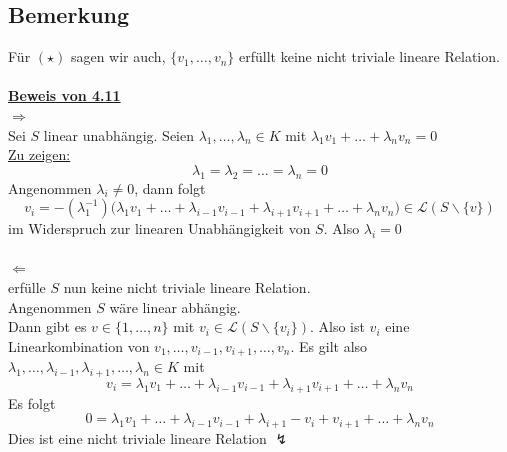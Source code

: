 \subsection{Bemerkung} %
\label{sub:bemerkung}
Für $(\star)$ sagen wir auch, $\{v_1, \ldots , v_n\}$ erfüllt keine nicht triviale lineare Relation. \\
\vspace{\baselineskip} \\
\underline{\textbf{Beweis von 4.11}}
\vspace{\baselineskip} \\
\grqq$\Longrightarrow$\grqq \\
Sei $S$ linear unabhängig. Seien $\lambda_1, \ldots , \lambda_n \in K$ mit $\lambda_1 v_1 + \ldots + \lambda_n v_n = 0$ \\
\underline{Zu zeigen:}
\[
	\lambda_1 = \lambda_2 = \ldots = \lambda_n = 0
\]
Angenommen $\lambda_i \not= 0$, dann folgt
\[
	v_i = - (\lambda_1^{-1}) \big(\lambda_1 v_1+ \ldots + \lambda_{i-1} v_{i-1} + \lambda_{i+1} v_{i+1} + \ldots + \lambda_n v_n \big)
	\in \mathcal{L} (S \backslash \{v\})
\]
im Widerspruch zur linearen Unabhängigkeit von $S$. Also $\lambda_i = 0$ \\
\vspace{\baselineskip} \\
\grqq$\Longleftarrow$\grqq \\
erfülle $S$ nun keine nicht triviale lineare Relation. \\
Angenommen $S$ wäre linear abhängig. 
\vspace{\baselineskip} \\
Dann gibt es $v  \in \{1, \ldots , n\}$ mit $v_i \in \mathcal{L}(S \backslash \{v_i\})$. Also ist $v_i$ eine Linearkombination von $v_1, \ldots , v_{i-1}, v_{i+1}, \ldots , v_n$. Es gilt also
$\lambda_1, \ldots , \lambda_{i-1}, \lambda_{i+1}, \ldots , \lambda_n \in K$ mit 
\[
	v_i = \lambda_1 v_1 + \ldots + \lambda_{i-1} v_{i-1} + \lambda_{i+1} v_{i+1} + \ldots + \lambda_n v_n
\]
Es folgt \[
	0= \lambda_1 v_1 + \ldots + \lambda_{i-1} v_{i-1} + \lambda_{i+1} - v_i +v_{i+1} + \ldots + \lambda_n v_n
\]
Dies ist eine nicht triviale lineare Relation {\huge $\lightning$}

